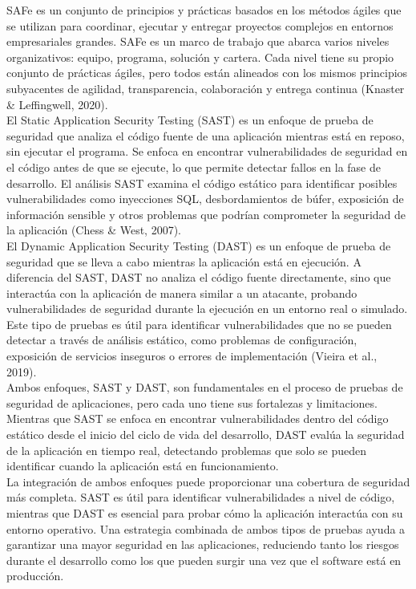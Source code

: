 \documentclass[12pt,letterpaper,spanish, xcolor=table]{report}
\numberwithin{figure}{subsection}
\begin{document}
SAFe es un conjunto de principios y prácticas basados en los métodos ágiles que se utilizan para coordinar, ejecutar y entregar proyectos complejos en entornos empresariales grandes. SAFe es un marco de trabajo que abarca varios niveles organizativos: equipo, programa, solución y cartera. Cada nivel tiene su propio conjunto de prácticas ágiles, pero todos están alineados con los mismos principios subyacentes de agilidad, transparencia, colaboración y entrega continua (Knaster \& Leffingwell, 2020).\\

El Static Application Security Testing (SAST) es un enfoque de prueba de seguridad que analiza el código fuente de una aplicación mientras está en reposo, sin ejecutar el programa. Se enfoca en encontrar vulnerabilidades de seguridad en el código antes de que se ejecute, lo que permite detectar fallos en la fase de desarrollo. El análisis SAST examina el código estático para identificar posibles vulnerabilidades como inyecciones SQL, desbordamientos de búfer, exposición de información sensible y otros problemas que podrían comprometer la seguridad de la aplicación (Chess \& West, 2007).\\

El Dynamic Application Security Testing (DAST) es un enfoque de prueba de seguridad que se lleva a cabo mientras la aplicación está en ejecución. A diferencia del SAST, DAST no analiza el código fuente directamente, sino que interactúa con la aplicación de manera similar a un atacante, probando vulnerabilidades de seguridad durante la ejecución en un entorno real o simulado. Este tipo de pruebas es útil para identificar vulnerabilidades que 
no se pueden detectar a través de análisis estático, como problemas de configuración, exposición de servicios inseguros o errores de implementación (Vieira et al., 2019).\\

Ambos enfoques, SAST y DAST, son fundamentales en el proceso de pruebas de 
seguridad de aplicaciones, pero cada uno tiene sus fortalezas y limitaciones. Mientras que SAST se enfoca en encontrar vulnerabilidades dentro del código estático desde el inicio del ciclo de vida del desarrollo, DAST evalúa la seguridad de la aplicación en tiempo real, detectando problemas que solo se pueden identificar cuando la aplicación está en funcionamiento.\\

La integración de ambos enfoques puede proporcionar una cobertura de seguridad más completa. SAST es útil para identificar vulnerabilidades a nivel de código, mientras que DAST es esencial para probar cómo la aplicación interactúa con su entorno operativo. Una estrategia combinada de ambos tipos de pruebas ayuda a garantizar una mayor seguridad 
en las aplicaciones, reduciendo tanto los riesgos durante el desarrollo como los que pueden surgir una vez que el software está en producción.\\
\end{document}
